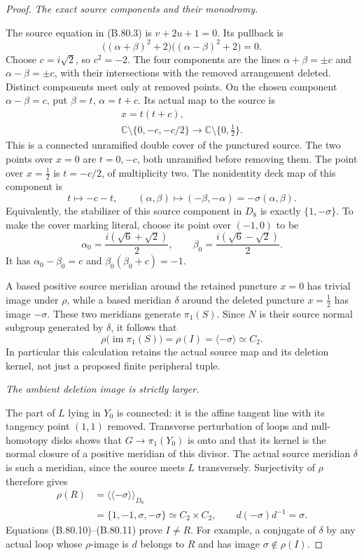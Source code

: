 \begin{proof}
\emph{The exact source components and their monodromy.}\par
The source equation in (B.80.3) is \(v+2u+1=0\). Its pullback is
\[
       \bigl((\alpha+\beta)^2+2\bigr)
       \bigl((\alpha-\beta)^2+2\bigr)=0.
 \tag{B.80.7}
\]
Choose \(c=i\sqrt2\), so \(c^2=-2\). The four components
are the lines
\(\alpha+\beta=\pm c\) and \(\alpha-\beta=\pm c\), with
their intersections with the removed arrangement deleted. Distinct
components meet only at removed points. On the chosen component
\(\alpha-\beta=c\), put \(\beta=t\), \(\alpha=t+c\). Its
actual map to the source is
\[
\begin{gathered}
 x=t(t+c),\\
 \mathbb C\setminus\{0,-c,-c/2\}
       \longrightarrow\mathbb C\setminus\{0,\tfrac12\}.
\end{gathered}
 \tag{B.80.8}
\]
This is a connected unramified double cover of the punctured source.
The two points over \(x=0\) are \(t=0,-c\), both unramified
before removing them. The point over \(x=\tfrac12\) is
\(t=-c/2\), of multiplicity two. The nonidentity deck map of this
component is
\[
             t\longmapsto-c-t,
 \qquad (\alpha,\beta)\longmapsto(-\beta,-\alpha)
                         =-\sigma(\alpha,\beta).
 \tag{B.80.9}
\]
Equivalently, the stabilizer of this source component in \(D_8\)
is exactly \(\{1,-\sigma\}\). To make the cover marking literal,
choose its point over \((-1,0)\) to be
\[
 \alpha_0=\frac{i(\sqrt6+\sqrt2)}2,\qquad
 \beta_0=\frac{i(\sqrt6-\sqrt2)}2.
\]
It has \(\alpha_0-\beta_0=c\) and
\(\beta_0(\beta_0+c)=-1\).

A based positive source meridian around the retained puncture
\(x=0\) has trivial image under \(\rho\), while a based meridian
\(\delta\) around the deleted puncture \(x=\tfrac12\) has image
\(-\sigma\). These two meridians generate \(\pi_1(S)\).
Since \(N\) is their source normal subgroup generated by
\(\delta\), it follows that
\[
        \rho\bigl(\operatorname{im}\pi_1(S)\bigr)
            =\rho(I)=\langle-\sigma\rangle\simeq C_2.
 \tag{B.80.10}
\]
In particular this calculation retains the actual source map and
its deletion kernel, not just a proposed finite peripheral tuple.

\emph{The ambient deletion image is strictly larger.}\par
The part of \(L\) lying in \(Y_0\) is connected: it is the
affine tangent line with its tangency point \((1,1)\) removed.
Transverse perturbation of loops and null-homotopy disks shows
that \(G\to\pi_1(Y_0)\) is onto and that its kernel is the
normal closure of a positive meridian of this divisor. The actual
source meridian \(\delta\) is such a meridian, since the source
meets \(L\) transversely. Surjectivity of \(\rho\) therefore gives
\[
\begin{aligned}
 \rho(R)
   &=\langle\!\langle-\sigma\rangle\!\rangle_{D_8}\\
   &=\{1,-1,\sigma,-\sigma\}\simeq C_2\times C_2,
 \qquad d(-\sigma)d^{-1}=\sigma.
\end{aligned}
 \tag{B.80.11}
\]
Equations (B.80.10)--(B.80.11) prove \(I\ne R\). For example,
a conjugate of \(\delta\) by any actual loop whose \(\rho\)-image
is \(d\) belongs to \(R\) and has image \(\sigma\notin\rho(I)\).


\end{proof}
